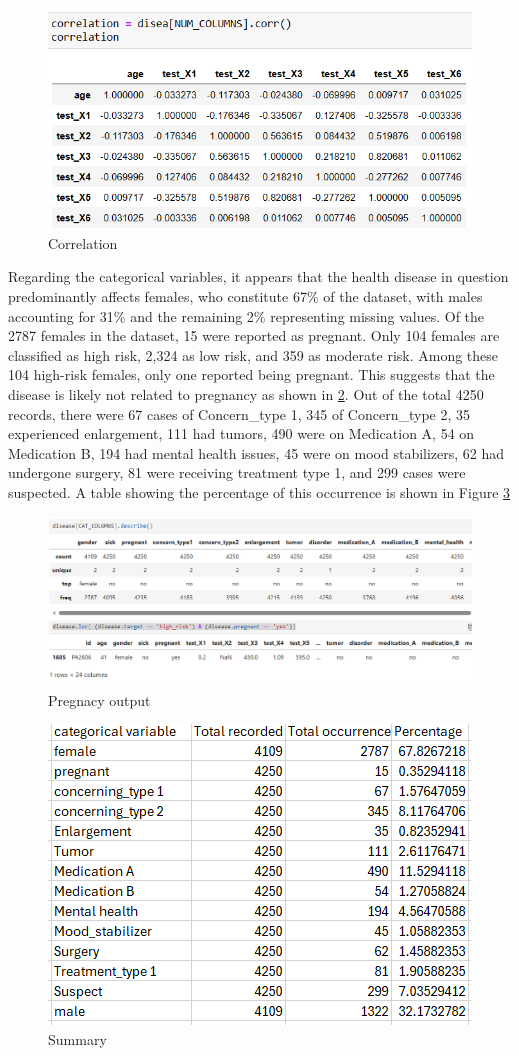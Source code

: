 \documentclass[a4paper]{article}
\begin{document}
\begin{figure}
    \centering
    \includegraphics[width=0.5\linewidth]{correlation.png}
    \caption{Correlation}
    \label{fig:correla}
\end{figure}
Regarding the categorical variables, it appears that the health disease in question predominantly affects females, who constitute 67\% of the dataset, with males accounting for 31\% and the remaining 2\% representing missing values. Of the 2787 females in the dataset, 15 were reported as pregnant. Only 104 females are classified as high risk, 2,324 as low risk, and 359 as moderate risk. Among these 104 high-risk females, only one reported being pregnant. This suggests that the disease is likely not related to pregnancy as shown in \ref{fig:preg}. Out of the total 4250 records, there were 67 cases of Concern\_type 1, 345 of Concern\_type 2, 35 experienced enlargement, 111 had tumors, 490 were on Medication A, 54 on Medication B, 194 had mental health issues, 45 were on mood stabilizers, 62 had undergone surgery, 81 were receiving treatment type 1, and 299 cases were suspected. A table showing the percentage of this occurrence is shown in Figure \ref{fig:percen}
\begin{figure}
    \centering
    \includegraphics[width=0.5\linewidth]{gender.png}
    \caption{Pregnacy output}
    \label{fig:preg}
\end{figure}
\begin{figure}
    \centering
    \includegraphics[width=0.5\linewidth]{data_mining_coursework.png}
    \caption{Summary}
    \label{fig:percen}
\end{figure}
\end{document}
